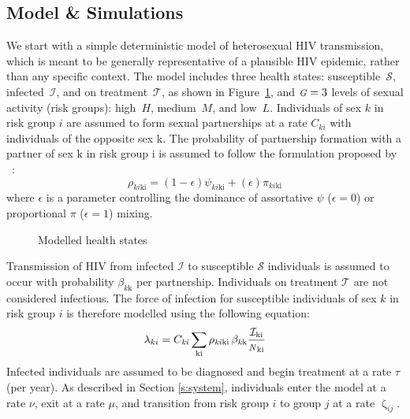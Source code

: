 \documentclass[10pt]{article}
\numberwithin{equation}{section}
\renewcommand{\zeta}{\upzeta}
\newcommand{\N}{{\mbox{\footnotesize{\textit{N}}}}}
\newcommand{\G}{{\mbox{\footnotesize{\textit{G}}}}}
\newcommand{\fig}[1]{Figure~\ref{#1}}
\begin{document}
\subsection{Model \& Simulations}\label{ss:model}
We start with a simple deterministic model of heterosexual HIV transmission,
which is meant to be generally representative of a plausible HIV epidemic,
rather than any specific context.
The model includes three health states:
susceptible~$\mathcal{S}$, infected~$\mathcal{I}$, and on treatment~$\mathcal{T}$,
as shown in \fig{fig:health-states},
and $\G = 3$ levels of sexual activity (risk groups):
high~$H$, medium~$M$, and low~$L$.
Individuals of sex $\mathit{k}$ in risk group $i$ are assumed to
form sexual partnerships at a rate $C_{ki}$
with individuals of the opposite sex $\mathrm{k}$.
The probability of partnership formation with
a partner of sex $\mathrm{k}$ in risk group $\mathrm{i}$
is assumed to follow
the formulation proposed by \citeauthor{Garnett1994}~\cite{Garnett1994}: %
\begin{equation}
  \rho_{\mathit{ki}\mathrm{ki}} =
  (1-\epsilon)\psi_{\mathit{ki}\mathrm{ki}}
   +(\epsilon)\pi_{\mathit{ki}\mathrm{ki}}
\end{equation}
where $\epsilon$ is a parameter controlling the dominance of
assortative $\psi$ ($\epsilon = 0$) or proportional $\pi$ ($\epsilon = 1$) mixing.
\begin{figure}
  \centering
  \caption{Modelled health states}\label{fig:health-states}
\end{figure}
\par
Transmission of HIV from infected $\mathcal{I}$ to susceptible $\mathcal{S}$ individuals
is assumed to occur with probability $\beta_{\mathit{k}\mathrm{k}}$ per partnership.
Individuals on treatment $\mathcal{T}$ are not considered infectious.
The force of infection for susceptible individuals of sex $k$ in risk group $i$
is therefore modelled using the following equation:%
\begin{equation}
  \lambda_{ki} =
  C_{\mathit{ki}}
  \sum_{\mathrm{ki}}
  \rho_{\mathit{ki}\mathrm{ki}} \thinspace
  \beta_{\mathit{k}\mathrm{k}}
  \frac{\mathcal{I}_{\mathrm{ki}}}{\N_{\mathrm{ki}}}
  \label{eq:foi}
\end{equation}
Infected individuals are assumed to be diagnosed and begin treatment at a rate $\tau$ (per year).
As described in Section \ref{s:system},
individuals enter the model at a rate $\nu$,
exit at a rate $\mu$,
and transition from risk group $i$ to group $j$ at a rate $\zeta_{ij}$.
\end{document}
